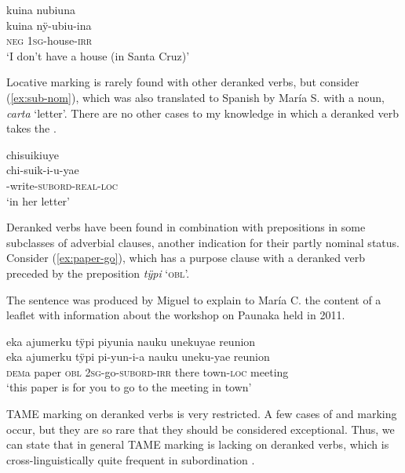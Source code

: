 \ea\label{ex:sub-irrnv}
\begingl
\glpreamble kuina nubiuna\\
\gla kuina nÿ-ubiu-ina\\
\glb \textsc{neg} 1\textsc{sg}-house-\textsc{irr}\\
\glft ‘I don’t have a house (in Santa Cruz)’
\endgl
\trailingcitation{[rxx-e120511l.233]}
\xe

Locative marking is rarely found with other deranked verbs, but consider (\ref{ex:sub-nom}), which was also translated to Spanish by María S. with a noun, \textit{carta} ‘letter’. There are no other cases to my knowledge in which a deranked verb takes the .

\ea\label{ex:sub-nom}
\begingl 
\glpreamble chisuikiuye\\
\gla chi-suik-i-u-yae\\ 
-write-\textsc{subord}-\textsc{real}-\textsc{loc}\\ 
\glft ‘in her letter’
\trailingcitation{[rxx-e121128s-1.026]}
\xe


Deranked verbs have been found in combination with prepositions in some subclasses of adverbial clauses, another indication for their partly nominal status. Consider (\ref{ex:paper-go}), which has a purpose clause with a deranked verb preceded by the preposition \textit{tÿpi} ‘\textsc{obl}’.

The sentence was produced by Miguel to explain to María C. the content of a leaflet with information about the workshop on Paunaka held in 2011.

\ea\label{ex:paper-go}
\begingl
\glpreamble eka ajumerku tÿpi piyunia nauku unekuyae reunion\\
\gla eka ajumerku tÿpi pi-yun-i-a nauku uneku-yae reunion\\
\glb \textsc{dem}a paper \textsc{obl} 2\textsc{sg}-go-\textsc{subord}-\textsc{irr} there town-\textsc{loc} meeting\\
\glft ‘this paper is for you to go to the meeting in town’
\endgl
\trailingcitation{[mux-c110810l.012]}
\xe


TAME marking on deranked verbs is very restricted. A few cases of  and  marking occur, but they are so rare that they should be considered exceptional. Thus, we can state that in general TAME marking is lacking on deranked verbs, which is cross-linguistically quite frequent in subordination \citep[cf.][66]{Cristofaro2003}.  

